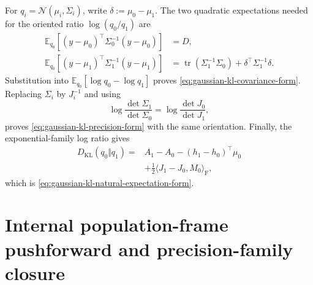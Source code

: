For $q_i=\mathcal N(\mu_i,\Sigma_i)$, write $\delta:=\mu_0-\mu_1$.  The two quadratic expectations needed for the oriented ratio $\log(q_0/q_1)$ are
\begin{equation}
\begin{aligned}
\mathbb E_{q_0}
[(y-\mu_0)^\top\Sigma_0^{-1}(y-\mu_0)]
&=D,\\
\mathbb E_{q_0}
[(y-\mu_1)^\top\Sigma_1^{-1}(y-\mu_1)]
&=\operatorname{tr}(\Sigma_1^{-1}\Sigma_0)
+\delta^\top\Sigma_1^{-1}\delta.
\end{aligned}
\label{eq:gaussian-kl-quadratic-expectations}
\end{equation}
Substitution into $\mathbb E_{q_0}[\log q_0-\log q_1]$ proves \cref{eq:gaussian-kl-covariance-form}.  Replacing $\Sigma_i$ by $J_i^{-1}$ and using
\begin{equation}
\log\frac{\det\Sigma_1}{\det\Sigma_0}
=\log\frac{\det J_0}{\det J_1},
\label{eq:gaussian-kl-determinant-conversion}
\end{equation}
proves \cref{eq:gaussian-kl-precision-form} with the same orientation.  Finally, the exponential-family log ratio gives
\begin{equation}
\begin{aligned}
D_{\mathrm{KL}}(q_0\Vert q_1)
={}&A_1-A_0
-(h_1-h_0)^\top\mu_0\\
&+\frac12\langle J_1-J_0,M_0\rangle_{\mathrm F},
\end{aligned}
\label{eq:natural-expectation-kl-derivation}
\end{equation}
which is \cref{eq:gaussian-kl-natural-expectation-form}.

\section{Internal population-frame pushforward and precision-family closure}

